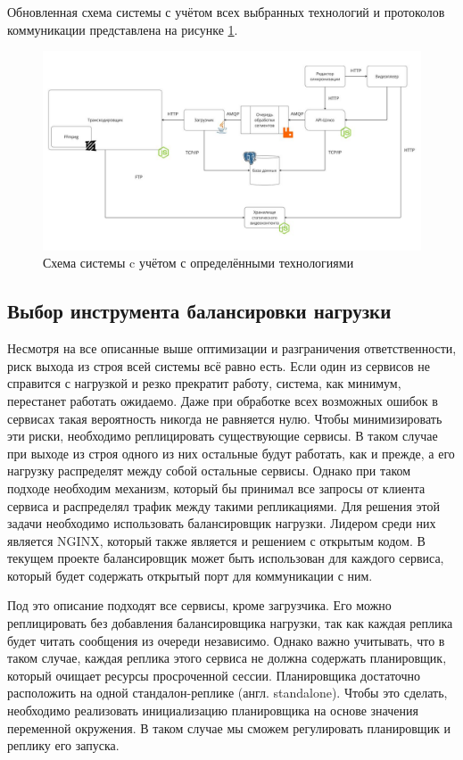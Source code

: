 	Обновленная схема системы с учётом всех выбранных технологий и протоколов коммуникации представлена на рисунке \ref{fig:system_scheme_5}.
	\begin{figure}[ht!] 
		\center
		\includegraphics [scale=0.35] {my_folder/images//system_scheme_5}
		\caption{Схема системы c учётом с определёнными технологиями} 
		\label{fig:system_scheme_5}  
	\end{figure}

	\subsection{Выбор инструмента балансировки нагрузки}

	Несмотря на все описанные выше оптимизации и разграничения ответственности, риск выхода из строя всей системы всё равно есть. Если один из сервисов не справится с нагрузкой и резко прекратит работу, система, как минимум, перестанет работать ожидаемо. Даже при обработке всех возможных ошибок в сервисах такая вероятность никогда не равняется нулю. Чтобы минимизировать эти риски, необходимо реплицировать существующие сервисы. В таком случае при выходе из строя одного из них остальные будут работать, как и прежде, а его нагрузку распределят между собой остальные сервисы. Однако при таком подходе необходим механизм, который бы принимал все запросы от клиента сервиса и распределял трафик между такими репликациями. Для решения этой задачи необходимо использовать балансировщик нагрузки. Лидером среди них является NGINX, который также является и решением с открытым кодом. В текущем проекте балансировщик может быть использован для каждого сервиса, который будет содержать открытый порт для коммуникации с ним.
	
	Под это описание подходят все сервисы, кроме загрузчика. Его можно реплицировать без добавления балансировщика нагрузки, так как каждая реплика будет читать сообщения из очереди независимо. Однако важно учитывать, что в таком случае, каждая реплика этого сервиса не должна содержать планировщик, который очищает ресурсы просроченной сессии. Планировщика достаточно расположить на одной стандалон-реплике (англ. standalone). Чтобы это сделать, необходимо реализовать инициализацию планировщика на основе значения переменной окружения. В таком случае мы сможем регулировать планировщик и реплику его запуска.

